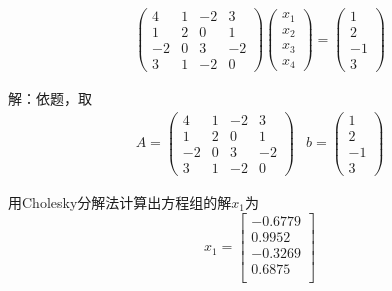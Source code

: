 \documentclass[12pt, a4paper, oneside]{ctexart}
\begin{document}
	\begin{equation}
	\begin{aligned}
		\left(\begin{array}{cccc}
			4 & 1  & -2 & 3 \\
			1 &  2 &  0 & 1 \\
	   		-2 & 0 &  3 & -2 \\
			3 & 1  & -2 & 0
		\end{array}\right)
		\left(\begin{array}{c}
			x_1 \\ x_2 \\ x_3\\x_4
		\end{array}\right)
		=
		\left(\begin{array}{c}
			1\\2\\-1\\3
		\end{array}\right)
	\end{aligned}
\end{equation}

解：依题，取
\begin{equation*}
\begin{aligned}
	A = \left(\begin{array}{cccc}
		4 & 1  & -2 & 3 \\
		1 &  2 &  0 & 1 \\
		-2 & 0 &  3 & -2 \\
		3 & 1  & -2 & 0
	\end{array}\right)
\end{aligned}
\begin{aligned}
	b = \left(\begin{array}{cccc}
		1\\2\\-1\\3
	\end{array}\right)
\end{aligned}
\end{equation*}

用Cholesky分解法计算出方程组的解$x_1$为\[
x_1 = \begin{bmatrix}
	-0.6779 \\
	0.9952 \\
	-0.3269 \\
	0.6875 \\
\end{bmatrix}
\]
\end{document}
